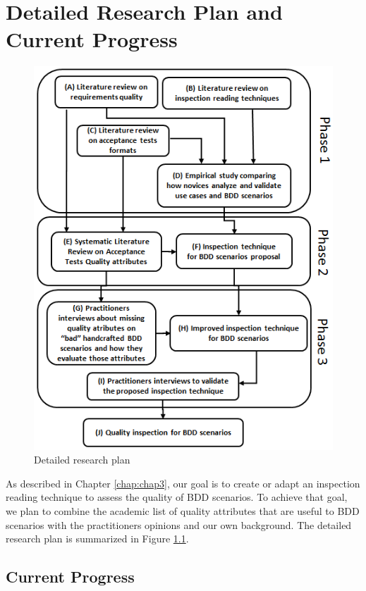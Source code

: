 \chapter{\label{chap:chap6}{Detailed Research Plan and Current Progress}}

\begin{figure}[b!]
\centering
\includegraphics[scale=0.85]{images/Research-Plan-2}
\caption{Detailed research plan}
\label{fig:planning}
\end{figure}

As described in Chapter \ref{chap:chap3}, our goal is to create or adapt an inspection reading technique to assess the quality of BDD scenarios. To achieve that goal, we plan to combine the academic list of quality attributes that are useful to BDD scenarios with the practitioners opinions and our own background. The detailed research plan is summarized in Figure \ref{fig:planning}. 

\section{Current Progress}

